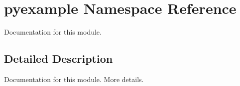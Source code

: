 \hypertarget{namespacepyexample}{\section{pyexample \-Namespace \-Reference}
\label{namespacepyexample}
}


\-Documentation for this module.  




\subsection{\-Detailed \-Description}
\-Documentation for this module. \-More details. 